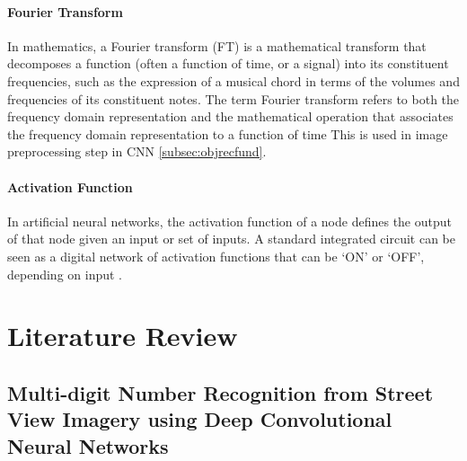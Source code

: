 \documentclass[12pt, a4paper]{report}
\begin{document}
\subsubsection{Fourier Transform}
In mathematics, a Fourier transform (FT) is a mathematical transform that decomposes a function (often a function of time, or a signal) into its constituent frequencies, such as the expression of a musical chord in terms of the volumes and frequencies of its constituent notes. The term Fourier transform refers to both the frequency domain representation and the mathematical operation that associates the frequency domain representation to a function of time \cite{wiki:fortrsfm} This is used in image preprocessing step in CNN \eqref{subsec:objrecfund}.

\subsubsection{Activation Function}
In artificial neural networks, the activation function of a node defines the output of that node given an input or set of inputs. A standard integrated circuit can be seen as a digital network of activation functions that can be `ON' or `OFF', depending on input \cite{wiki:actfnc}.

\vspace*{\fill}

\chapter{Literature Review}
\label{chap:literature}
\thispagestyle{fancy}

\section{Multi-digit Number Recognition from Street View Imagery using Deep Convolutional Neural Networks}
\label{sec:litppr1}
\end{document}
